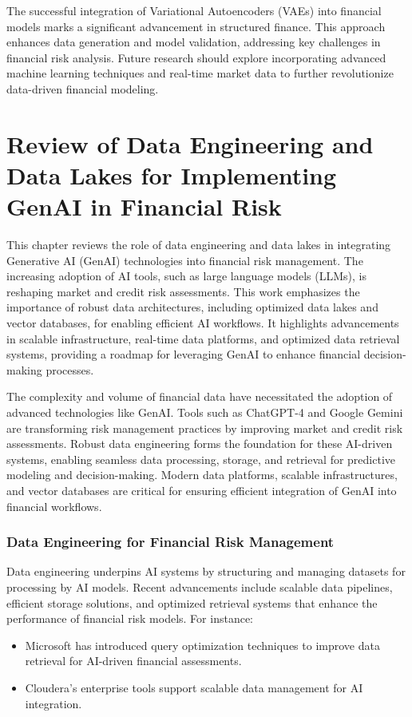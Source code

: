 \documentclass[a4paper,headinclude=on,footinclude=on,12pt,oneside]{scrbook}
\begin{document}
	The successful integration of Variational Autoencoders (VAEs) into financial models marks a significant advancement in structured finance. This approach enhances data generation and model validation, addressing key challenges in financial risk analysis. Future research should explore incorporating advanced machine learning techniques and real-time market data to further revolutionize data-driven financial modeling.
	
	\chapter{Review of Data Engineering and Data Lakes for Implementing GenAI in Financial Risk}
	
	This chapter reviews the role of data engineering and data lakes in integrating Generative AI (GenAI) technologies into financial risk management. The increasing adoption of AI tools, such as large language models (LLMs), is reshaping market and credit risk assessments. This work emphasizes the importance of robust data architectures, including optimized data lakes and vector databases, for enabling efficient AI workflows. It highlights advancements in scalable infrastructure, real-time data platforms, and optimized data retrieval systems, providing a roadmap for leveraging GenAI to enhance financial decision-making processes.
	
	The complexity and volume of financial data have necessitated the adoption of advanced technologies like GenAI. Tools such as ChatGPT-4 and Google Gemini are transforming risk management practices by improving market and credit risk assessments. Robust data engineering forms the foundation for these AI-driven systems, enabling seamless data processing, storage, and retrieval for predictive modeling and decision-making. Modern data platforms, scalable infrastructures, and vector databases are critical for ensuring efficient integration of GenAI into financial workflows.
	
	\subsection{Data Engineering for Financial Risk Management}
	Data engineering underpins AI systems by structuring and managing datasets for processing by AI models. Recent advancements include scalable data pipelines, efficient storage solutions, and optimized retrieval systems that enhance the performance of financial risk models. For instance:
	\begin{itemize}
		\item Microsoft has introduced query optimization techniques to improve data retrieval for AI-driven financial assessments.
		\item Cloudera's enterprise tools support scalable data management for AI integration.
	\end{itemize}
	
\end{document}
